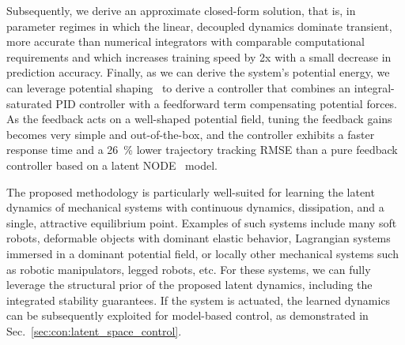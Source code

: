 
Subsequently, we derive an approximate closed-form solution, that is, in parameter regimes in which the linear, decoupled dynamics dominate transient, more accurate than numerical integrators with comparable computational requirements and which increases training speed by 2x with a small decrease in prediction accuracy.
Finally, as we can derive the system's potential energy, we can leverage potential shaping~\citep{bloch2001controlled, ortega2021pid} to derive a controller that combines an integral-saturated PID controller with a feedforward term compensating potential forces.
As the feedback acts on a well-shaped potential field, tuning the feedback gains becomes very simple and out-of-the-box, and the controller exhibits a faster response time and a \SI{26}{\percent} lower trajectory tracking \gls{RMSE} than a pure feedback controller based on a latent \gls{NODE}~\citep{chen2018neural} model.

The proposed methodology is particularly well-suited for learning the latent dynamics of mechanical systems with continuous dynamics, dissipation, and a single, attractive equilibrium point. Examples of such systems include many soft robots, deformable objects with dominant elastic behavior, Lagrangian systems immersed in a dominant potential field, or locally other mechanical systems such as robotic manipulators, legged robots, etc. For these systems, we can fully leverage the structural prior of the proposed latent dynamics, including the integrated stability guarantees. If the system is actuated, the learned dynamics can be subsequently exploited for model-based control, as demonstrated in Sec.~\ref{sec:con:latent_space_control}.

